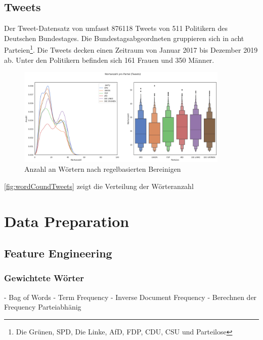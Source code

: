 \subsection{Tweets}

Der Tweet-Datensatz von \textcite{saltzer_finding_2022} umfasst \num{876118} Tweets von \num{511} Politikern des Deutschen Bundestages. Die Bundestagsabgeordneten gruppieren sich in acht Parteien\footnote{Die Grünen, \ac{SPD}, Die Linke, \ac{AfD}, \ac{FDP}, \ac{CDU}, \ac{CSU} und Parteilose}. Die Tweets decken einen Zeitraum von Januar \num{2017} bis Dezember \num{2019} ab. Unter den Politikern befinden sich \num{161} Frauen und \num{350} Männer.


\begin{figure}[H]
    \centering
    \includegraphics[width=0.9\textwidth]{data/images/tweets_word_count.png}
    \caption{Anzahl an Wörtern nach regelbasierten Bereinigen} \label{fig:wordCoundTweets}
\end{figure}


\autoref{fig:wordCoundTweets} zeigt die Verteilung der Wörteranzahl 

\section{Data Preparation} \label{sec:dataPreparation}

\subsection{Feature Engineering} \label{subsec:featureEngineering}

\subsubsection{Gewichtete Wörter}

- Bag of Words 
- Term Frequency - Inverse Document Frequency 
    - Berechnen der Frequency Parteiabhänig

